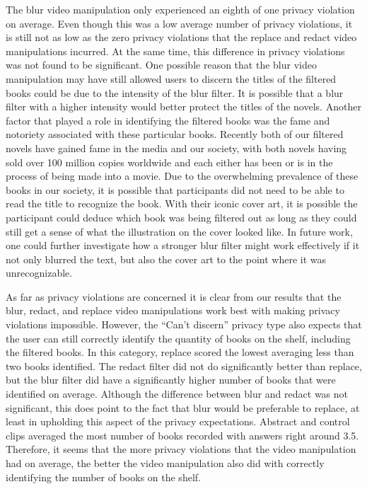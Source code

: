 \documentclass{acm_proc_article-sp}
\begin{document}
 The blur video manipulation only experienced an eighth of one privacy violation on average. Even though this was a low average number of privacy violations, it is still not as low as the zero privacy violations that the replace and redact video manipulations incurred. At the same time, this difference in privacy violations was not found to be significant. One possible reason that the blur video manipulation may have still allowed users to discern the titles of the filtered books could be due to the intensity of the blur filter. It is possible that a blur filter with a higher intensity would better protect the titles of the novels. Another factor that played a role in identifying the filtered books was the fame and notoriety associated with these particular books. Recently both of our filtered novels have gained fame in the media and our society, with both novels having sold over 100 million copies worldwide and each either has been or is in the process of being made into a movie. Due to the overwhelming prevalence of these books in our society, it is possible that participants did not need to be able to read the title to recognize the book. With their iconic cover art, it is possible the participant could deduce which book was being filtered out as long as they could still get a sense of what the illustration on the cover looked like. In future work, one could further investigate how a stronger blur filter might work effectively if it not only blurred the text, but also the cover art to the point where it was unrecognizable. 

As far as privacy violations are concerned it is clear from our results that the blur, redact, and replace video manipulations work best with making privacy violations impossible. However, the ``Can't discern'' privacy type also expects that the user can still correctly identify the quantity of books on the shelf, including the filtered books. In this category, replace scored the lowest averaging less than two books identified. The redact filter did not do significantly better than replace, but the blur filter did have a significantly higher number of books that were identified on average. Although the difference between blur and redact was not significant, this does point to the fact that blur would be preferable to replace, at least in upholding this aspect of the privacy expectations. Abstract and control clips averaged the most number of books recorded with answers right around 3.5.  Therefore, it seems that the more privacy violations that the video manipulation had on average, the better the video manipulation also did with correctly identifying the number of books on the shelf. 
\end{document}
